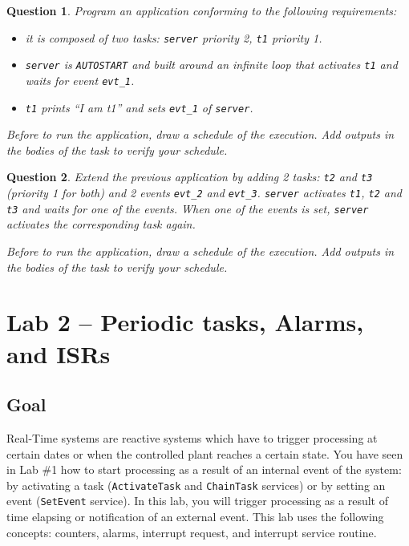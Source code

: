 \documentclass[11pt]{report}
\newtheorem{ex}{Question}
\begin{document}
\begin{ex}
  Program an application conforming to the following requirements:

  \begin{itemize}
    \item it is composed of two tasks: \texttt{server} priority 2, \texttt{t1} priority 1.
    \item \texttt{server} is \texttt{AUTOSTART} and built around an infinite loop that activates \texttt{t1} and waits for event \texttt{evt\_1}.
    \item \texttt{t1} prints ``I am t1'' and sets \texttt{evt\_1} of \texttt{server}.
  \end{itemize}

  Before to run the application, draw a schedule of the execution. Add outputs in the bodies of the task to verify your schedule.
\end{ex}

\begin{ex}
  Extend the previous application by adding 2 tasks: \texttt{t2} and \texttt{t3} (priority 1 for both) and 2 events \texttt{evt\_2} and \texttt{evt\_3}. \texttt{server} activates \texttt{t1}, \texttt{t2} and \texttt{t3} and waits for one of the events. When one of the events is set, \texttt{server} activates the corresponding task again.

  Before to run the application, draw a schedule of the execution. Add outputs in the bodies of the task to verify your schedule.
\end{ex}

\chapter{Lab 2 -- Periodic tasks, Alarms, and ISRs}

\section{Goal}

Real-Time systems are reactive systems which have to trigger processing at certain dates or when the controlled plant reaches a certain state.
You have seen in Lab \#1 how to start processing as a result of an internal event of the system: by activating a task (\texttt{ActivateTask} and \texttt{ChainTask} services) or by setting an event (\texttt{SetEvent} service).
In this lab, you will trigger processing as a result of time elapsing or notification of an external event.
This lab uses the following concepts: counters, alarms, interrupt request, and interrupt service routine.
\end{document}
